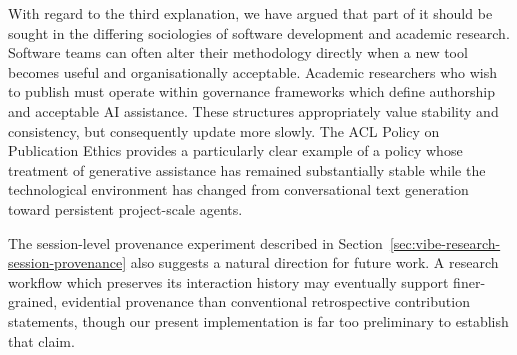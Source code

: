 \documentclass[12pt]{article}
\begin{document}
With regard to the third explanation, we have argued that part of it should be sought in the differing sociologies of software development and academic research. Software teams can often alter their methodology directly when a new tool becomes useful and organisationally acceptable. Academic researchers who wish to publish must operate within governance frameworks which define authorship and acceptable AI assistance. These structures appropriately value stability and consistency, but consequently update more slowly. The ACL Policy on Publication Ethics provides a particularly clear example of a policy whose treatment of generative assistance has remained substantially stable while the technological environment has changed from conversational text generation toward persistent project-scale agents.


The session-level provenance experiment described in Section~\ref{sec:vibe-research-session-provenance} also suggests a natural direction for future work. A research workflow which preserves its interaction history may eventually support finer-grained, evidential provenance than conventional retrospective contribution statements, though our present implementation is far too preliminary to establish that claim.


\end{document}
